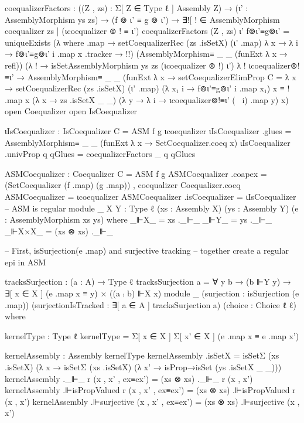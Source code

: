       coequalizerFactors : ((Z , zs) : Σ[ Z ∈ Type ℓ ] Assembly Z)
                         → (ι' : AssemblyMorphism ys zs)
                         → (f ⊚ ι' ≡ g ⊚ ι')
                         → ∃![ ! ∈ AssemblyMorphism coequalizer zs ] (ιcoequalizer ⊚ ! ≡ ι')
      coequalizerFactors (Z , zs) ι' f⊚ι'≡g⊚ι' =
        uniqueExists (λ where
                        .map → setCoequalizerRec (zs .isSetX) (ι' .map) λ x → λ i → f⊚ι'≡g⊚ι' i .map x
                        .tracker → {!!})
                        (AssemblyMorphism≡ _ _ (funExt λ x → refl))
                        (λ ! → isSetAssemblyMorphism ys zs (ιcoequalizer ⊚ !) ι')
                        λ ! ιcoequalizer⊚!≡ι' → AssemblyMorphism≡ _ _
                            (funExt λ x →
                              setCoequalizerElimProp
                              {C = λ x → setCoequalizerRec (zs .isSetX) (ι' .map) (λ x₁ i → f⊚ι'≡g⊚ι' i .map x₁) x ≡ ! .map x}
                              (λ x → zs .isSetX _ _) (λ y → λ i → ιcoequalizer⊚!≡ι' (~ i) .map y) x)
      open Coequalizer
      open IsCoequalizer

      ιIsCoequalizer : IsCoequalizer {C = ASM} f g ιcoequalizer
      ιIsCoequalizer .glues = AssemblyMorphism≡ _ _ (funExt λ x → SetCoequalizer.coeq x)
      ιIsCoequalizer .univProp q qGlues = coequalizerFactors _ q qGlues
      
      ASMCoequalizer : Coequalizer {C = ASM} f g
      ASMCoequalizer .coapex = (SetCoequalizer (f .map) (g .map)) , coequalizer
      Coequalizer.coeq ASMCoequalizer = ιcoequalizer
      ASMCoequalizer .isCoequalizer = ιIsCoequalizer
  -- ASM is regular
  module _
    {X Y : Type ℓ}
    (xs : Assembly X)
    (ys : Assembly Y)
    (e : AssemblyMorphism xs ys)
    where
      _⊩X_ = xs ._⊩_
      _⊩Y_ = ys ._⊩_
      _⊩X×X_ = (xs ⊗ xs) ._⊩_
      
      -- First, isSurjection(e .map) and surjective tracking
      -- together create a regular epi in ASM

      tracksSurjection : (a : A) → Type ℓ
      tracksSurjection a = ∀ y b → (b ⊩Y y) → ∃[ x ∈ X ] (e .map x ≡ y) × ((a ⨾ b) ⊩X x)
      module _
        (surjection : isSurjection (e .map))
        (surjectionIsTracked : ∃[ a ∈ A ] tracksSurjection a)
        (choice : Choice ℓ ℓ)
        where

        kernelType : Type ℓ
        kernelType = Σ[ x ∈ X ] Σ[ x' ∈ X ] (e .map x ≡ e .map x')

        kernelAssembly : Assembly kernelType
        kernelAssembly .isSetX = isSetΣ (xs .isSetX) (λ x → isSetΣ (xs .isSetX) (λ x' → isProp→isSet (ys .isSetX _ _)))
        kernelAssembly ._⊩_ r (x , x' , ex≡ex') = (xs ⊗ xs) ._⊩_ r (x , x')
        kernelAssembly .⊩isPropValued r (x , x' , ex≡ex') = (xs ⊗ xs) .⊩isPropValued r (x , x')
        kernelAssembly .⊩surjective (x , x' , ex≡ex') = (xs ⊗ xs) .⊩surjective (x , x')

